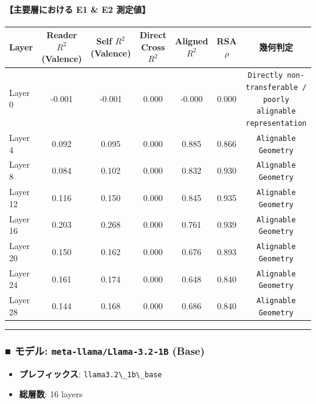 \paragraph{【主要層における E1 \& E2 測定値】}
\begin{center}
\small
\begin{tabular}{lcccccc}
\toprule
\textbf{Layer} & \textbf{Reader $R^2$ (Valence)} & \textbf{Self $R^2$ (Valence)} & \textbf{Direct Cross $R^2$} & \textbf{Aligned $R^2$} & \textbf{RSA $\rho$} & \textbf{幾何判定} \\
\midrule
Layer  0 & -0.001 & -0.001 & 0.000 & -0.000 & 0.000 & \texttt{Directly non-transferable / poorly alignable representation} \\
Layer  4 & 0.092 & 0.095 & 0.000 & 0.885 & 0.866 & \texttt{Alignable Geometry} \\
Layer  8 & 0.084 & 0.102 & 0.000 & 0.832 & 0.930 & \texttt{Alignable Geometry} \\
Layer 12 & 0.116 & 0.150 & 0.000 & 0.845 & 0.935 & \texttt{Alignable Geometry} \\
Layer 16 & 0.203 & 0.268 & 0.000 & 0.761 & 0.939 & \texttt{Alignable Geometry} \\
Layer 20 & 0.150 & 0.162 & 0.000 & 0.676 & 0.893 & \texttt{Alignable Geometry} \\
Layer 24 & 0.161 & 0.174 & 0.000 & 0.648 & 0.840 & \texttt{Alignable Geometry} \\
Layer 28 & 0.144 & 0.168 & 0.000 & 0.686 & 0.840 & \texttt{Alignable Geometry} \\
\bottomrule
\end{tabular}
\end{center}



\vspace{0.5em}\hrule\vspace{0.5em}

\subsubsection{■ モデル: \texttt{meta-llama/Llama-3.2-1B} (Base)}
\begin{itemize}
\item \textbf{プレフィックス}: \texttt{llama3.2\textbackslash{}\_1b\textbackslash{}\_base}
\item \textbf{総層数}: 16 layers
\end{itemize}

